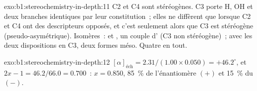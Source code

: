 \begin{solution}{exo:b1:stereochemistry-in-depth:11}
C2 et C4 sont stéréogènes. C3 porte H, OH et deux branches identiques
par leur constitution~; elles ne diffèrent que lorsque C2 et C4 ont des
descripteurs opposés, et c'est seulement alors que C3 est stéréogène
(pseudo-asymétrique). Isomères~:  et , un couple
d' (C3 non stéréogène)~;  avec les deux
dispositions en C3, deux formes méso. Quatre en tout.
\end{solution}

\begin{solution}{exo:b1:stereochemistry-in-depth:12}
$[\alpha]_{\text{éch}} = 2.31/(1.00 \times 0.050) = +46.2^\circ$, et
$2x - 1 = 46.2/66.0 = 0.700$~: $x = 0.850$, \qty{85}{\percent} de
l'énantiomère $(+)$ et \qty{15}{\percent} du $(-)$.
\end{solution}

